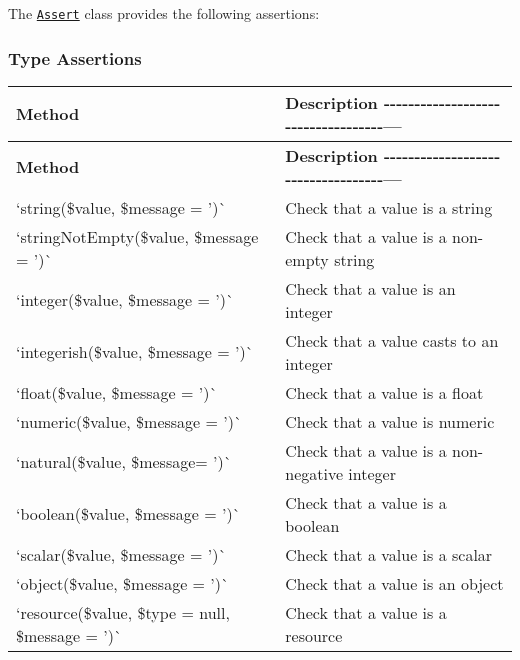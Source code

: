 The \href{src/Assert.php}{\tt {\ttfamily Assert}} class provides the following assertions\+:

\subsubsection*{Type Assertions}

\tabulinesep=1mm
\begin{longtabu} spread 0pt [c]{*{2}{|X[-1]}|}
\hline
\rowcolor{\tableheadbgcolor}\textbf{ Method  }&\textbf{ Description -\/-\/-\/-\/-\/-\/-\/-\/-\/-\/-\/-\/-\/-\/-\/-\/-\/-\/-\/-\/-\/-\/-\/-\/-\/-\/-\/-\/-\/-\/-\/-\/-\/-\/-\/---   }\\
\endfirsthead
\hline
\endfoot
\hline
\rowcolor{\tableheadbgcolor}\textbf{ Method  }&\textbf{ Description -\/-\/-\/-\/-\/-\/-\/-\/-\/-\/-\/-\/-\/-\/-\/-\/-\/-\/-\/-\/-\/-\/-\/-\/-\/-\/-\/-\/-\/-\/-\/-\/-\/-\/-\/---   }\\
\endhead
`string(\$value, \$message = '\textquotesingle{})\`{}  &Check that a value is a string   \\
`string\+Not\+Empty(\$value, \$message = '\textquotesingle{})\`{}  &Check that a value is a non-\/empty string   \\
`integer(\$value, \$message = '\textquotesingle{})\`{}  &Check that a value is an integer   \\
`integerish(\$value, \$message = '\textquotesingle{})\`{}  &Check that a value casts to an integer   \\
`float(\$value, \$message = '\textquotesingle{})\`{}  &Check that a value is a float   \\
`numeric(\$value, \$message = '\textquotesingle{})\`{}  &Check that a value is numeric   \\
`natural(\$value, \$message= '\textquotesingle{}\textquotesingle{})\`{}  &Check that a value is a non-\/negative integer   \\
`boolean(\$value, \$message = '\textquotesingle{})\`{}  &Check that a value is a boolean   \\
`scalar(\$value, \$message = '\textquotesingle{})\`{}  &Check that a value is a scalar   \\
`object(\$value, \$message = '\textquotesingle{})\`{}  &Check that a value is an object   \\
`resource(\$value, \$type = null, \$message = '\textquotesingle{})\`{}  &Check that a value is a resource   \\

\end{longtabu}
